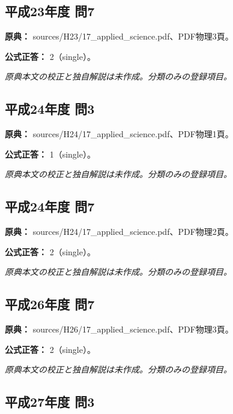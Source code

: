 \subsection{平成23年度 問7}
\label{q:h23-reg-applied-07}

\noindent\textbf{原典：} sources/H23/17\_applied\_science.pdf、PDF物理3頁。

\textbf{公式正答：} 2（single）。

\par\textit{原典本文の校正と独自解説は未作成。分類のみの登録項目。}

\subsection{平成24年度 問3}
\label{q:h24-reg-applied-03}

\noindent\textbf{原典：} sources/H24/17\_applied\_science.pdf、PDF物理1頁。

\textbf{公式正答：} 1（single）。

\par\textit{原典本文の校正と独自解説は未作成。分類のみの登録項目。}

\subsection{平成24年度 問7}
\label{q:h24-reg-applied-07}

\noindent\textbf{原典：} sources/H24/17\_applied\_science.pdf、PDF物理2頁。

\textbf{公式正答：} 2（single）。

\par\textit{原典本文の校正と独自解説は未作成。分類のみの登録項目。}

\subsection{平成26年度 問7}
\label{q:h26-reg-applied-07}

\noindent\textbf{原典：} sources/H26/17\_applied\_science.pdf、PDF物理3頁。

\textbf{公式正答：} 2（single）。

\par\textit{原典本文の校正と独自解説は未作成。分類のみの登録項目。}

\subsection{平成27年度 問3}
\label{q:h27-reg-applied-03}

